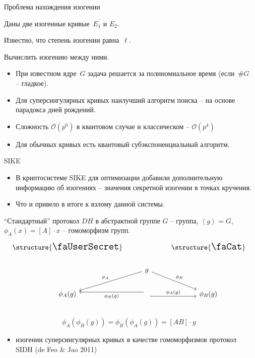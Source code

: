 \documentclass{beamer}
\begin{document}
\begin{frame}{Проблема нахождения изогении}
	\begin{center}
		\begin{tcolorbox}[enhanced,hbox,colback=title-and-section-color!5,colframe=title-and-section-color!120,title=Общая задача нахождения изогении,center title]
			\begin{varwidth}{\textwidth}
				\begin{center}
					Даны две изогенные кривые~$E_1$ и $E_2$. 
					
					Известно, что степень изогении равна~$\ell$. 
					
					Вычислить изогению между ними.
				\end{center}
			\end{varwidth}
		\end{tcolorbox}	
	\end{center}
\begin{itemize}
	\item При известном ядре~$G$ задача решается за полиномиальное время (если~$\#G$ -- гладкое).
	\item Для суперсингулярных кривых наилучший алгоритм поиска -- на основе парадокса дней рождений.
	\item Сложность $\mathcal{O}(p^6)$ в квантовом случае и классическом -- $\mathcal{O}(p^4)$
	\item Для обычных кривых есть квантовый субэкспоненциальный алгоритм.
\end{itemize}
\end{frame}

\begin{frame}{SIKE}
	\begin{itemize}
		\item В криптосистеме SIKE для оптимизации добавили дополнительную информацию об изогениях -- значения секретной изогении в точках кручения.
		\item Что и привело в итоге к взлому данной системы.
	\end{itemize}
\end{frame}

\begin{frame}[fragile]{``Стандартный'' протокол $DH$ в абстрактной группе}
	$G$ -- группа, $\left<g\right> = G$, $\phi_A(x) = [A] \cdot x$ -- гомоморфизм групп.
	\[
	\begin{tikzcd}
		\text{\structure{{\Large\faUserSecret}}} & & \text{\structure{{\Large\faCat}}} \\
		& \arrow{ld}[swap]{\phi_A} g \arrow{rd}{\phi_B}  \\
		\phi_A(g) & \arrow[yshift=-0.7ex]{r}{\phi_A(g)} \arrow[yshift=0.7ex]{l}{\phi_B(g)}  & \phi_B(g)\\
	\end{tikzcd}
	\]
	\[
	\phi_A(\phi_B(g)) = \phi_B(\phi_A(g)) = [A B]\cdot g
	\]
	\begin{itemize}
		\item изогении суперсингулярных кривых в качестве гомоморфизмов \structure{$\Rightarrow$} протокол SIDH (de Feo \& Jao 2011)
	\end{itemize}
\end{frame}
\end{document}
